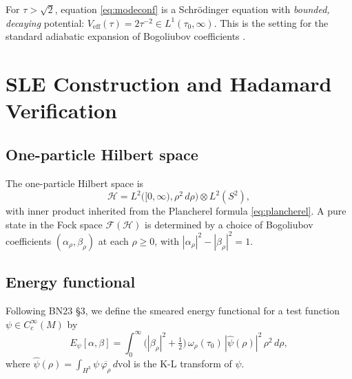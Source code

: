 \documentclass[12pt,letterpaper]{article}
\newcommand{\cF}{\mathcal{F}}
\newcommand{\cH}{\mathcal{H}}
\begin{document}
For $\tau > \sqrt{2}$, equation \eqref{eq:modeconf} is a
Schr\"{o}dinger equation with \emph{bounded, decaying} potential:
$V_{\mathrm{eff}}(\tau) = 2\tau^{-2} \in L^1(\tau_0,\infty)$.
This is the setting for the standard adiabatic expansion of
Bogoliubov coefficients \cite{BN23,LuedersRoberts90}.

\section{SLE Construction and Hadamard Verification}
\label{sec:SLE}

\subsection{One-particle Hilbert space}

The one-particle Hilbert space is
\begin{equation}
  \cH = L^2\bigl([0,\infty), \rho^2\,d\rho\bigr)
  \otimes L^2(S^2),
\end{equation}
with inner product inherited from the Plancherel formula
\eqref{eq:plancherel}.
A pure state in the Fock space $\cF(\cH)$ is determined
by a choice of Bogoliubov coefficients $(\alpha_\rho, \beta_\rho)$
at each $\rho \geq 0$, with $|\alpha_\rho|^2 - |\beta_\rho|^2 = 1$.

\subsection{Energy functional}

Following BN23 \cite{BN23} \S3, we define the smeared energy functional
for a test function $\psi \in C_c^\infty(M)$ by
\begin{equation}
  E_\psi[\alpha,\beta]
  = \int_0^\infty \bigl(|\beta_\rho|^2 + \tfrac{1}{2}\bigr)
    \,\omega_\rho(\tau_0)\,|\hat\psi(\rho)|^2\,\rho^2\,d\rho,
  \label{eq:energy}
\end{equation}
where $\hat\psi(\rho) = \int_{H^3} \psi\,\overline{\varphi_\rho}\,d\mathrm{vol}$
is the K-L transform of $\psi$.
\end{document}
